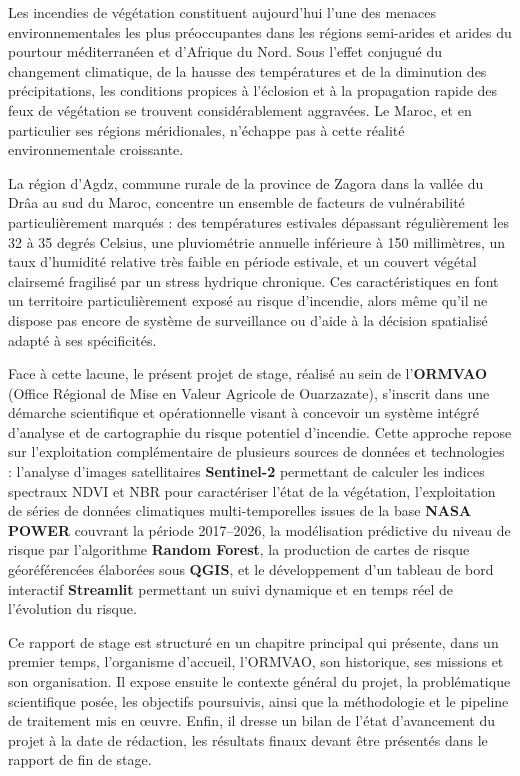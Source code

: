 \documentclass[12pt,a4paper]{report}
\begin{document}
Les incendies de végétation constituent aujourd'hui l'une des menaces environnementales les plus préoccupantes dans les régions semi-arides et arides du pourtour méditerranéen et d'Afrique du Nord. Sous l'effet conjugué du changement climatique, de la hausse des températures et de la diminution des précipitations, les conditions propices à l'éclosion et à la propagation rapide des feux de végétation se trouvent considérablement aggravées. Le Maroc, et en particulier ses régions méridionales, n'échappe pas à cette réalité environnementale croissante.

La région d'Agdz, commune rurale de la province de Zagora dans la vallée du Drâa au sud du Maroc, concentre un ensemble de facteurs de vulnérabilité particulièrement marqués : des températures estivales dépassant régulièrement les 32 à 35 degrés Celsius, une pluviométrie annuelle inférieure à 150 millimètres, un taux d'humidité relative très faible en période estivale, et un couvert végétal clairsemé fragilisé par un stress hydrique chronique. Ces caractéristiques en font un territoire particulièrement exposé au risque d'incendie, alors même qu'il ne dispose pas encore de système de surveillance ou d'aide à la décision spatialisé adapté à ses spécificités.

Face à cette lacune, le présent projet de stage, réalisé au sein de l'\textbf{ORMVAO} (Office Régional de Mise en Valeur Agricole de Ouarzazate), s'inscrit dans une démarche scientifique et opérationnelle visant à concevoir un système intégré d'analyse et de cartographie du risque potentiel d'incendie. Cette approche repose sur l'exploitation complémentaire de plusieurs sources de données et technologies : l'analyse d'images satellitaires \textbf{Sentinel-2} permettant de calculer les indices spectraux NDVI et NBR pour caractériser l'état de la végétation, l'exploitation de séries de données climatiques multi-temporelles issues de la base \textbf{NASA POWER} couvrant la période 2017--2026, la modélisation prédictive du niveau de risque par l'algorithme \textbf{Random Forest}, la production de cartes de risque géoréférencées élaborées sous \textbf{QGIS}, et le développement d'un tableau de bord interactif \textbf{Streamlit} permettant un suivi dynamique et en temps réel de l'évolution du risque.

Ce rapport de stage est structuré en un chapitre principal qui présente, dans un premier temps, l'organisme d'accueil, l'ORMVAO, son historique, ses missions et son organisation. Il expose ensuite le contexte général du projet, la problématique scientifique posée, les objectifs poursuivis, ainsi que la méthodologie et le pipeline de traitement mis en œuvre. Enfin, il dresse un bilan de l'état d'avancement du projet à la date de rédaction, les résultats finaux devant être présentés dans le rapport de fin de stage.
\end{document}

